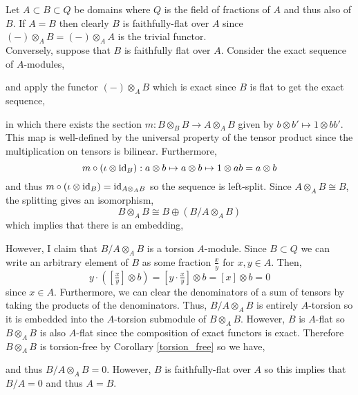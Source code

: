 \documentclass[12pt]{extarticle}
\begin{document}
Let $A \subset B \subset Q$ be domains where $Q$ is the field of fractions of $A$ and thus also of $B$. If $A = B$ then clearly $B$ is faithfully-flat over $A$ since $(-) \otimes_A B = (-) \otimes_A A$ is the trivial functor.
\bigskip\\
Conversely, suppose that $B$ is faithfully flat over $A$. Consider the exact sequence of $A$-modules,
\begin{center}
\end{center}
and apply the functor $(-) \otimes_A B$ which is exact since $B$ is flat to get the exact sequence,
\begin{center}
\end{center}
in which there exists the section $m : B \otimes_B B \to A \otimes_A B$ given by $b \otimes b' \mapsto 1 \otimes bb'$. This map is well-defined by the universal property of the tensor product since the multiplication on tensors is bilinear. Furthermore,
\[ m \circ (\iota \otimes \mathrm{id}_B) : a \otimes b \mapsto a \otimes b \mapsto 1 \otimes ab = a \otimes b \]
and thus $m \circ (\iota \otimes \mathrm{id}_B) = \mathrm{id}_{A \otimes_A B}$ so the sequence is left-split. Since $A \otimes_A B \cong B$, the splitting gives an isomorphism,
\[ B \otimes_A B \cong B \oplus \left( B/A \otimes_A B \right) \]
which implies that there is an embedding,
\begin{center}
\end{center}
However, I claim that $B / A \otimes_A B$ is a torsion $A$-module. Since $B \subset Q$ we can write an arbitrary element of $B$ as some fraction $\frac{x}{y}$ for $x, y \in A$. Then,
\[ y \cdot ([\tfrac{x}{y}] \otimes b) = [y \cdot \tfrac{x}{y}] \otimes b = [x] \otimes b = 0\]
since $x \in A$. Furthermore, we can clear the denominators of a sum of tensors by taking the products of the denominators. Thus, $B / A \otimes_A B$ is entirely $A$-torsion so it is embedded into the $A$-torsion submodule of $B \otimes_A B$. However, $B$ is $A$-flat so $B \otimes_A B$ is also $A$-flat since the composition of exact functors is exact. Therefore $B \otimes_A B$ is torsion-free by Corollary \ref{torsion_free} so we have,
\begin{center}
\end{center}
and thus $B / A \otimes_A B = 0$. However, $B$ is faithfully-flat over $A$ so this implies that $B / A = 0$ and thus $A = B$. 
\end{document}
